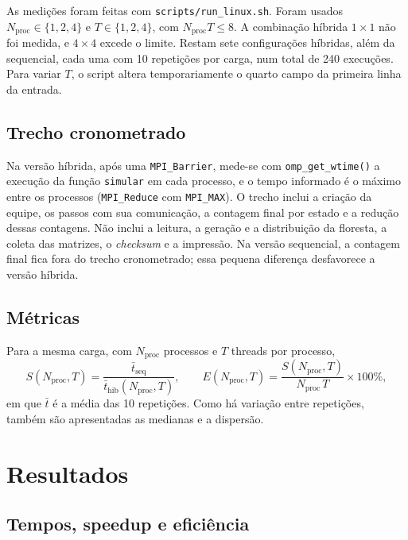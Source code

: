 \documentclass[11pt,a4paper]{article}
\begin{document}
As medições foram feitas com \texttt{scripts/run\_linux.sh}. Foram usados
$N_{\mathrm{proc}}\in\{1,2,4\}$ e $T\in\{1,2,4\}$, com
$N_{\mathrm{proc}}T\leq8$. A combinação híbrida $1\times1$ não foi medida, e
$4\times4$ excede o limite. Restam sete configurações híbridas, além da
sequencial, cada uma com 10 repetições por carga, num total de 240
execuções. Para variar $T$, o script altera temporariamente o quarto campo
da primeira linha da entrada.

\subsection{Trecho cronometrado}

Na versão híbrida, após uma \texttt{MPI\_Barrier}, mede-se com
\texttt{omp\_get\_wtime()} a execução da função \texttt{simular} em cada
processo, e o tempo informado é o máximo entre os processos
(\texttt{MPI\_Reduce} com \texttt{MPI\_MAX}). O trecho inclui a criação da
equipe, os passos com sua comunicação, a contagem final por estado e a
redução dessas contagens. Não inclui a leitura, a geração e a distribuição
da floresta, a coleta das matrizes, o \emph{checksum} e a impressão. Na
versão sequencial, a contagem final fica fora do trecho cronometrado; essa
pequena diferença desfavorece a versão híbrida.

\subsection{Métricas}

Para a mesma carga, com $N_{\mathrm{proc}}$ processos e $T$ threads por
processo,
\begin{equation}
S(N_{\mathrm{proc}},T)=\frac{\bar t_{\mathrm{seq}}}{\bar t_{\mathrm{hib}}(N_{\mathrm{proc}},T)},\qquad
E(N_{\mathrm{proc}},T)=\frac{S(N_{\mathrm{proc}},T)}{N_{\mathrm{proc}}\,T}\times100\%,
\end{equation}
em que $\bar t$ é a média das 10 repetições. Como há variação entre
repetições, também são apresentadas as medianas e a dispersão.

\section{Resultados}\label{sec:resultados}

\subsection{Tempos, speedup e eficiência}
\end{document}
